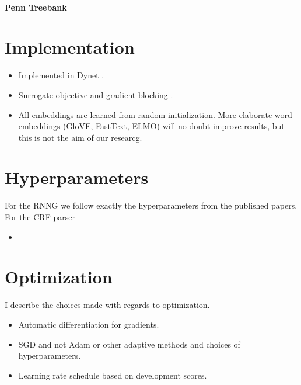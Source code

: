 \paragraph{Penn Treebank}

\section{Implementation}
\begin{itemize}
  \item Implemented in Dynet \citep{neubig2017dynet}.
  \item Surrogate objective and gradient blocking \cite{schulman2015gradient}.
  \item All embeddings are learned from random initialization. More elaborate word embeddings (GloVE, FastText, ELMO) will no doubt improve results, but this is not the aim of our researcg.
\end{itemize}

\section{Hyperparameters}
For the RNNG we follow exactly the hyperparameters from the published papers. For the CRF parser
\begin{itemize}
  \item
\end{itemize}

\section{Optimization}
I describe the choices made with regards to optimization.
\begin{itemize}
  \item Automatic differentiation \citep{baydin2018automatic} for gradients.
  \item SGD and not Adam or other adaptive methods \citep{wilson2017marginal} and choices of hyperparameters.
  \item Learning rate schedule based on development scores.
\end{itemize}
